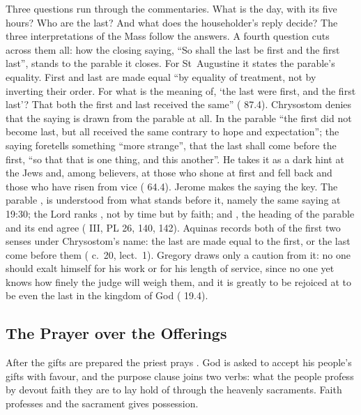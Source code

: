 Three questions run through the commentaries. What is the day, with its five
hours? Who are the last? And what does the householder's reply decide? The
three interpretations of the Mass follow the answers. A fourth question cuts across them
all: how the closing saying, ``So shall the last be first and the first
last'', stands to the parable it closes. For St~Augustine it states the
parable's equality. First and last are made equal ``by equality of treatment,
not by inverting their order. For what is the meaning of, `the last were
first, and the first last'? That both the first and last received the same''
( 87.4). Chrysostom denies that the saying is drawn from the
parable at all. In the parable ``the first did not become last, but all
received the same contrary to hope and expectation''; the saying foretells
something ``more strange'', that the last shall come before the first, ``so
that that is one thing, and this another''. He takes it as a dark hint at the
Jews and, among believers, at those who shone at first and fell back and those
who have risen from vice ( 64.4). Jerome makes the
saying the key. The parable ,
is understood from what stands before it, namely the same saying at 19:30; the
Lord ranks , not by time but by faith;
and , the heading of the
parable and its end agree ( III, PL 26, 140,
142). Aquinas
records both of the first two senses under Chrysostom's name: the last are
made equal to the first, or the last come before them (
c.~20, lect.~1). Gregory draws only a caution from it: no one should exalt
himself for his work or for his length of service, since no one yet knows how
finely the judge will weigh them, and it is greatly to be rejoiced at to be
even the last in the kingdom of God ( 19.4).

\subsection{The Prayer over the Offerings}

After the gifts are prepared the priest prays . God is asked to accept his people's gifts with favour,
and the purpose clause joins two verbs: what the people profess by devout faith
they are to lay hold of through the heavenly sacraments. Faith professes and
the sacrament gives possession.

